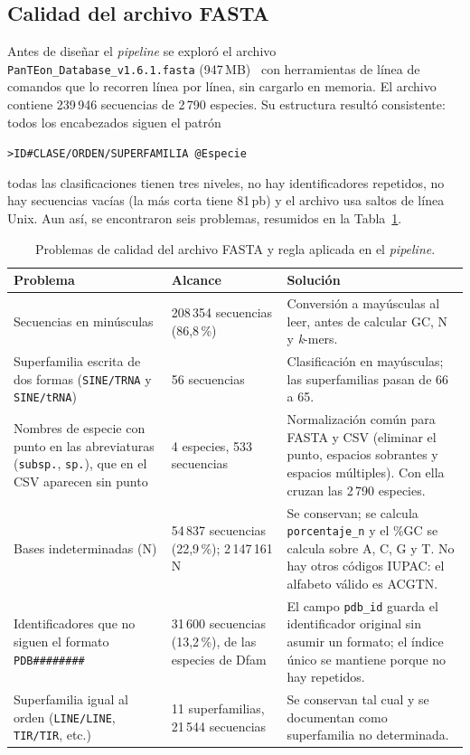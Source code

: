 \subsection*{Calidad del archivo FASTA}

Antes de diseñar el \textit{pipeline} se exploró el archivo
\texttt{PanTEon\_Database\_v1.6.1.fasta} (947\,MB)~\cite{panteon2026zenodo}
con herramientas de línea de comandos que lo recorren línea por línea,
sin cargarlo en memoria. El archivo contiene 239\,946 secuencias de
2\,790 especies. Su estructura resultó consistente: todos los
encabezados siguen el patrón
\begin{center}\texttt{>ID\#CLASE/ORDEN/SUPERFAMILIA @Especie}\end{center}
\noindent todas las clasificaciones
tienen tres niveles, no hay identificadores repetidos, no hay secuencias
vacías (la más corta tiene 81\,pb) y el archivo usa saltos de línea Unix.
Aun así, se encontraron seis problemas, resumidos en la
Tabla~\ref{tab:calidad_fasta}.

\begin{table}[htbp]
\centering
\caption{Problemas de calidad del archivo FASTA y regla aplicada en el
\textit{pipeline}.}
\label{tab:calidad_fasta}
\small
\setlength{\tabcolsep}{4pt}
\begin{tabular}{p{3.7cm}p{2.6cm}p{4.9cm}}
\hline
\textbf{Problema} & \textbf{Alcance} & \textbf{Solución} \\
\hline
Secuencias en minúsculas & 208\,354 secuencias (86,8\,\%) &
Conversión a mayúsculas al leer, antes de calcular GC, N y
\textit{k}-mers. \\
Superfamilia escrita de dos formas (\texttt{SINE/TRNA} y
\texttt{SINE/tRNA}) & 56 secuencias &
Clasificación en mayúsculas; las superfamilias pasan de 66 a 65. \\
Nombres de especie con punto en las abreviaturas (\texttt{subsp.},
\texttt{sp.}), que en el CSV aparecen sin punto & 4 especies, 533
secuencias & Normalización común para FASTA y CSV (eliminar el punto,
espacios sobrantes y espacios múltiples). Con ella cruzan las 2\,790
especies. \\
Bases indeterminadas (N) & 54\,837 secuencias (22,9\,\%); 2\,147\,161 N
& Se conservan; se calcula \texttt{porcentaje\_n} y el \%GC se calcula
sobre A, C, G y T. No hay otros códigos IUPAC: el alfabeto válido es
ACGTN. \\
Identificadores que no siguen el formato \texttt{PDB\#\#\#\#\#\#\#\#}
& 31\,600 secuencias (13,2\,\%), de las especies de Dfam &
El campo \texttt{pdb\_id} guarda el identificador original sin asumir
un formato; el índice único se mantiene porque no hay repetidos. \\
Superfamilia igual al orden (\texttt{LINE/LINE}, \texttt{TIR/TIR}, etc.)
& 11 superfamilias, 21\,544 secuencias &
Se conservan tal cual y se documentan como superfamilia no determinada.
\\
\hline
\end{tabular}
\end{table}

